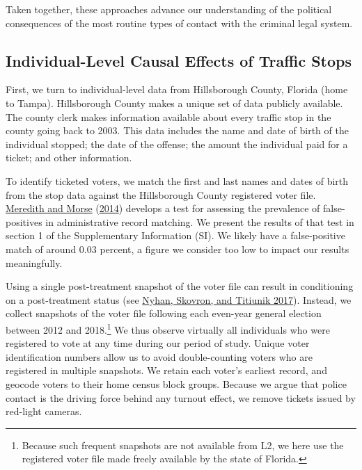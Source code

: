 \documentclass[
  12pt,
]{article}
\begin{document}
Taken together, these approaches advance our understanding of the political consequences of the most routine types of contact with the criminal legal system.

\hypertarget{individual-level-causal-effects-of-traffic-stops}{%
\subsection*{Individual-Level Causal Effects of Traffic Stops}\label{individual-level-causal-effects-of-traffic-stops}}

First, we turn to individual-level data from Hillsborough County, Florida (home to Tampa).
Hillsborough County makes a unique set of data publicly available. The county clerk makes information available about every traffic stop in the county going back to 2003. This data includes the name and date of birth of the individual stopped; the date of the offense; the amount the individual paid for a ticket; and other information.

To identify ticketed voters, we match the first and last names and dates of birth from the stop data against the Hillsborough County registered voter file. \protect\hyperlink{ref-Meredith2014}{Meredith and Morse} (\protect\hyperlink{ref-Meredith2014}{2014}) develops a test for assessing the prevalence of false-positives in administrative record matching. We present the results of that test in section 1 of the Supplementary Information (SI). We likely have a false-positive match of around 0.03 percent, a figure we consider too low to impact our results meaningfully.

Using a single post-treatment snapshot of the voter file can result in conditioning on a post-treatment status (see \protect\hyperlink{ref-Nyhan2017}{Nyhan, Skovron, and Titiunik 2017}). Instead, we collect snapshots of the voter file following each even-year general election between 2012 and 2018.\footnote{Because such frequent snapshots are not available from L2, we here use the registered voter file made freely available by the state of Florida.} We thus observe virtually all individuals who were registered to vote at any time during our period of study. Unique voter identification numbers allow us to avoid double-counting voters who are registered in multiple snapshots. We retain each voter's earliest record, and geocode voters to their home census block groups. Because we argue that police contact is the driving force behind any turnout effect, we remove tickets issued by red-light cameras.
\end{document}
